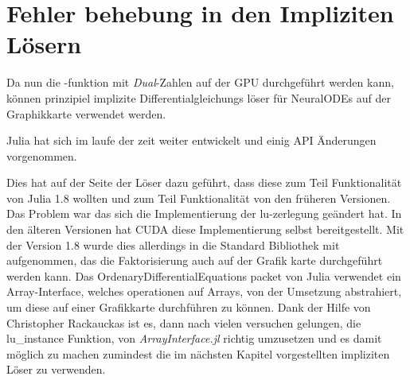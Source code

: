 
\section{ Fehler behebung in den Impliziten Lösern }

Da nun die -funktion mit \textit{Dual}-Zahlen auf der GPU durchgeführt werden kann, 
können prinzipiel implizite Differentialgleichungs löser für 
NeuralODEs auf der Graphikkarte verwendet werden.

Julia hat sich im laufe der zeit weiter entwickelt und einig API Änderungen vorgenommen.

Dies hat auf der Seite der Löser dazu geführt, dass diese zum Teil Funktionalität von Julia 1.8 wollten 
und zum Teil Funktionalität von den früheren Versionen.
Das Problem war das sich die Implementierung der lu-zerlegung geändert hat. %
In den älteren Versionen hat CUDA diese Implementierung selbst bereitgestellt.
Mit der Version 1.8 wurde dies allerdings in die Standard Bibliothek mit aufgenommen, 
das die Faktorisierung auch auf der Grafik karte durchgeführt werden kann.
Das OrdenaryDifferentialEquations packet von Julia verwendet 
ein Array-Interface, welches operationen auf Arrays, 
von der Umsetzung abstrahiert, um diese auf einer Grafikkarte durchführen zu können.
Dank der Hilfe von Christopher Rackauckas ist es, dann nach vielen versuchen gelungen, die lu\_instance Funktion, von \textit{ArrayInterface.jl} richtig umzusetzen 
und es damit möglich zu machen zumindest die im nächsten Kapitel vorgestellten impliziten Löser zu verwenden.
